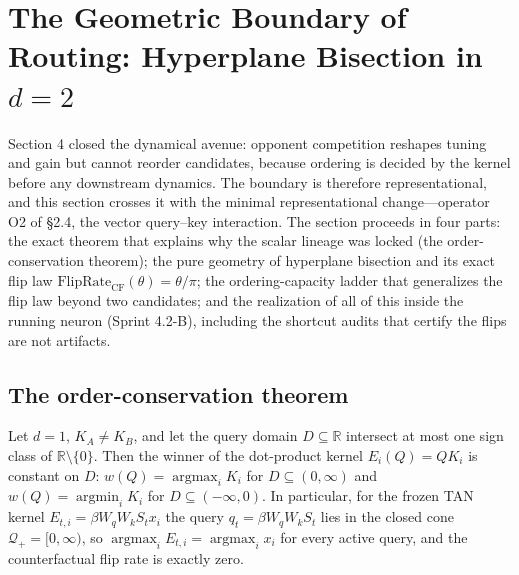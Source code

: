 \section{The Geometric Boundary of Routing: Hyperplane Bisection in
\texorpdfstring{$d=2$}{d=2}}
\label{sec:routing}

Section 4 closed the dynamical avenue: opponent competition reshapes
tuning and gain but cannot reorder candidates, because ordering is decided
by the kernel before any downstream dynamics. The boundary is therefore
representational, and this section crosses it with the minimal
representational change---operator O2 of §2.4, the vector query--key
interaction. The section proceeds in four parts: the exact theorem that
explains why the scalar lineage was locked (the order-conservation
theorem); the pure geometry of hyperplane bisection and its exact flip
law $\mathrm{FlipRate}_{\mathrm{CF}}(\theta)=\theta/\pi$; the
ordering-capacity ladder that generalizes the flip law beyond two
candidates; and the realization of all of this inside the running neuron
(Sprint 4.2-B), including the shortcut audits that certify the flips are
not artifacts.

\subsection{The order-conservation theorem}
\label{sec:orderconservation}

\begin{theorem}
\label{thm:order}
Let $d=1$, $K_A\neq K_B$, and let the query domain $D\subseteq\mathbb{R}$
intersect at most one sign class of $\mathbb{R}\setminus\{0\}$. Then the
winner of the dot-product kernel $E_i(Q)=QK_i$ is constant on $D$:
$w(Q)=\operatorname{argmax}_i K_i$ for $D\subseteq(0,\infty)$ and
$w(Q)=\operatorname{argmin}_i K_i$ for $D\subseteq(-\infty,0)$. In
particular, for the frozen TAN kernel $E_{t,i}=\beta W_qW_kS_tx_i$ the
query $q_t=\beta W_qW_kS_t$ lies in the closed cone $\mathcal{Q}_+=
[0,\infty)$, so $\operatorname{argmax}_i E_{t,i}=\operatorname{argmax}_i
x_i$ for every active query, and the counterfactual flip rate is exactly
zero.
\end{theorem}

